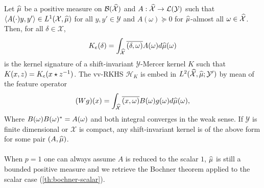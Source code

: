\begin{proposition}\label{pr:mercer_kernel_bochner}
    Let $\widehat{\mu}$ be a positive measure on
    $\mathcal{B}(\mathcal{\widehat{\mathcal{X}}})$ and $A: \widehat{\mathcal{X}}\to
    \mathcal{L}(\mathcal{Y})$ such that $\langle A(\cdot)y,y'\rangle\in
    L^1(\mathcal{X},\widehat{\mu})$ for all $y,y'\in\mathcal{Y}$ and
    $A(\omega)\succcurlyeq 0$ for $\widehat{\mu}$-almost all
    $\omega\in\widehat{\mathcal{X}}$. Then, for all $\delta \in \mathcal{X}$,
    \begin{dmath}
        \label{eq:AK0}
        K_e(\delta)=\int_{\dual{\mathcal{X}}} \conj{\pairing{\delta, \omega}}
        A(\omega) d\dual{\mu}(\omega)
    \end{dmath}
    is the kernel signature of a shift-invariant $\mathcal{Y}$-Mercer kernel
    $K$ such that $K(x,z)=K_e(x \star {z}^{-1})$. The \acs{vv-RKHS}
    $\mathcal{H}_K$ is embed in
    $L^2(\widehat{\mathcal{X}},\widehat{\mu};\mathcal{Y}')$ by mean of the feature
    operator
    \begin{dmath}
        \label{eq:feature_operator}
        (Wg)(x)=\int_{\mathcal{\dual{X}}} \conj{\pairing{x,\omega}} B(\omega)
        g(\omega) d\dual{\mu}(\omega),
    \end{dmath}
    Where $B(\omega)B(\omega)^*=A(\omega)$ and both integral converges
    in the weak sense. If $\mathcal{Y}$ is finite dimensional or $\mathcal{X}$
    is compact, any shift-invariant kernel is of the above form for some pair
    $(A, \widehat{\mu})$.
\end{proposition}
\paragraph{}
When $p=1$ one can always assume $A$ is reduced to the scalar $1$, $\widehat{\mu}$
is still a bounded positive measure and we retrieve the Bochner theorem applied
to the scalar case (\cref{th:bochner-scalar}).
